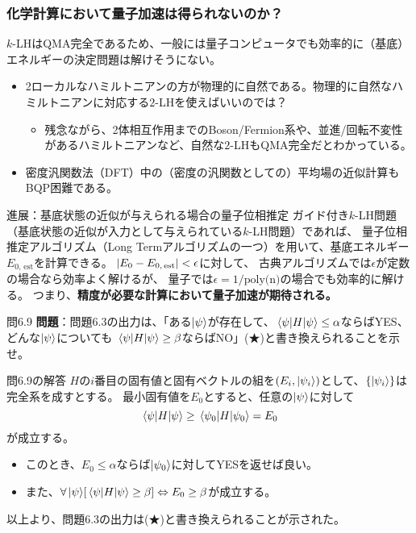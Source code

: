 \documentclass[11pt,aspectratio=169,xcolor=dvipsnames,table,dvipdfmx]{beamer}
\theoremstyle{definition}
\begin{document}
\begin{frame}
  \frametitle{化学計算において量子加速は得られないのか？}
$k$-LHはQMA完全であるため、一般には量子コンピュータでも効率的に（基底）エネルギーの決定問題は解けそうにない。

\begin{itemize}
  \item 2ローカルなハミルトニアンの方が物理的に自然である。物理的に自然なハミルトニアンに対応する$2$-LHを使えばいいのでは？
  \begin{itemize}
    \item 残念ながら、2体相互作用までのBoson/Fermion系や、並進/回転不変性があるハミルトニアンなど、自然な$2$-LHもQMA完全だとわかっている。
  \end{itemize}
  \item 密度汎関数法（DFT）中の（密度の汎関数としての）平均場の近似計算もBQP困難である。
\end{itemize}
  
\begin{exampleblock}{進展：基底状態の近似が与えられる場合の量子位相推定}
  ガイド付き$k$-LH問題（基底状態の近似が入力として与えられている$k$-LH問題）であれば、
  量子位相推定アルゴリズム（Long Termアルゴリズムの一つ）を用いて、基底エネルギー$E_{0,\,\text{est}}$を計算できる。
  $\abs{E_0 - E_{0,\,\text{est}}}<\epsilon$に対して、
  古典アルゴリズムでは$\epsilon$が定数の場合なら効率よく解けるが、
  量子では$\epsilon=1/\text{poly(n)}$の場合でも効率的に解ける。
  つまり、{\color{red}\textbf{精度が必要な計算において量子加速が期待される。}}
\end{exampleblock}



\end{frame}

\begin{frame}{問6.9}
  \textbf{問題}：問題6.3の出力は、「ある$\ket{\psi}$が存在して、$\ev{H}{\psi}\leq \alpha$ならばYES、どんな$\ket{\psi}$についても
  $\ev{H}{\psi}\geq \beta$ならばNO」(★)と書き換えられることを示せ。
  \begin{block}{問6.9の解答}
    $H$の$i$番目の固有値と固有ベクトルの組を$(E_i,\ket{\psi_i})$として、$\{\ket{\psi_i}\}$は完全系を成すとする。
    最小固有値を$E_0$とすると、任意の$\ket{\psi}$に対して
    \begin{equation}
      \ev{H}{\psi} \geq \ev{H}{\psi_0} = E_0
    \end{equation}
    が成立する。
    \begin{itemize}
      \item このとき、$E_0\leq \alpha$ならば$\ket{\psi_0}$に対してYESを返せば良い。
      \item また、$\forall\ket{\psi}\!\qty[\ev{H}{\psi}\geq \beta] \Leftrightarrow E_0\geq \beta$が成立する。
    \end{itemize}
    以上より、問題6.3の出力は(★)と書き換えられることが示された。
  \end{block}

\end{frame}
\end{document}
